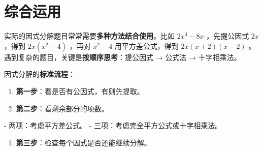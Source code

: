\section*{综合运用}


\begin{explore}


实际的因式分解题目常常需要\textbf{多种方法结合使用}。比如 $2x^3 - 8x$ ，先提公因式 $2x$ ，得到 $2x(x^2 - 4)$ ，再对 $x^2 - 4$ 用平方差公式，得到 $2x(x+2)(x-2)$ 。遇到复杂的题目，关键是\textbf{按顺序思考}：提公因式 → 公式法 → 十字相乘法。

\end{explore}

\begin{understand}


因式分解的\textbf{标准流程}：

\begin{enumerate}
  \item \textbf{第一步}：看是否有公因式，有则先提取。
  \item \textbf{第二步}：看剩余部分的项数。
\end{enumerate}

   - 两项：考虑平方差公式。
   - 三项：考虑完全平方公式或十字相乘法。
\begin{enumerate}
  \item \textbf{第三步}：检查每个因式是否还能继续分解。
\end{enumerate}


\end{understand}


